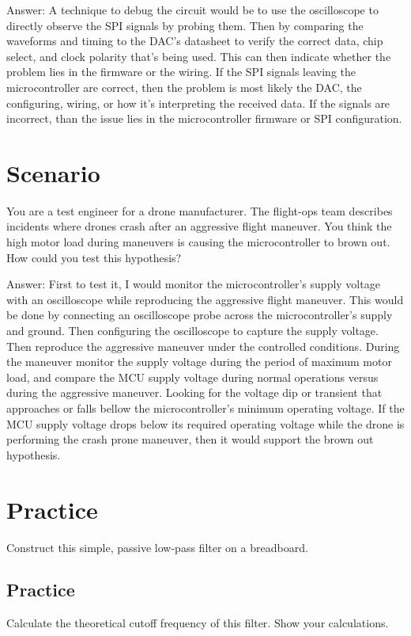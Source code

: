 \documentclass{article}
\begin{document}
Answer: A technique to debug the circuit would be to use the oscilloscope to directly observe the SPI signals by probing them. Then by comparing the waveforms and timing to the DAC's datasheet to verify the correct data, chip select, and clock polarity that's being used. This can then indicate whether the problem lies in the firmware or the wiring. If the SPI signals leaving the microcontroller are correct, then the problem is most likely the DAC, the configuring, wiring, or how it's interpreting the received data. If the signals are incorrect, than the issue lies in the microcontroller firmware or SPI configuration. 

\section{Scenario}
You are a test engineer for a drone manufacturer. The flight-ops team describes incidents where drones crash after an aggressive flight maneuver. You think the high motor load during maneuvers is causing the microcontroller to brown out. How could you test this hypothesis?

Answer: First to test it, I would monitor the microcontroller's supply voltage with an oscilloscope while reproducing the aggressive flight maneuver. This would be done by connecting an oscilloscope probe across the microcontroller's supply and ground. Then configuring the oscilloscope to capture the supply voltage. Then reproduce the aggressive maneuver under the controlled conditions. During the maneuver monitor the supply voltage during the period of maximum motor load, and compare the MCU supply voltage during normal operations versus during the aggressive maneuver. Looking for the voltage dip or transient that approaches or falls bellow the microcontroller's minimum operating voltage. If the MCU supply voltage drops below its required operating voltage while the drone is performing the crash prone maneuver, then it would support the brown out hypothesis. 

\section{Practice}
Construct this simple, passive low-pass filter on a breadboard.

\subsection{Practice}
Calculate the theoretical cutoff frequency of this filter. Show your calculations.
\end{document}
